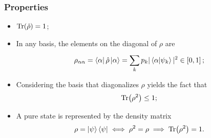 \subsubsection{Properties}
\begin{itemize}
\item $\Tr(\hat\rho) = 1$;
\item In any basis, the elements on the diagonal of $\rho$ are
    $$\rho_{\alpha\alpha}=\bra{\alpha}\hat\rho\ket{\alpha} = \sum_{k}^{}p_k
    |\bra{\alpha}\ket{\psi_k}|^2 \in \left[0,1\right];$$
\item Considering the basis that diagonalizes $\rho$ yields the fact that
    $$\Tr(\rho^2)\leq1;$$
\item A pure state is represented by the density matrix
    $$\rho = \ket{\psi}\bra{\psi}\iff \rho^2=\rho\implies\Tr(\rho^2)=1.$$
\end{itemize}

